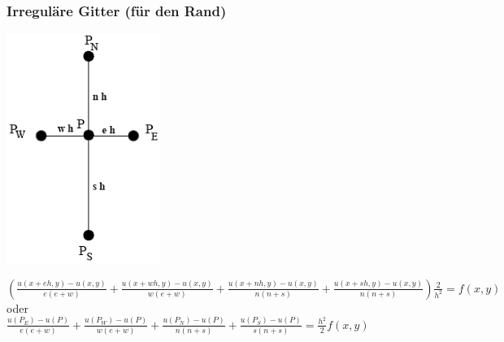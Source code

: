 \subsubsection{Irreguläre Gitter (für den Rand)}
\begin{minipage}{5cm}
	\includegraphics[width=5cm]{Content/Numerik/irregulaereGitter.png}

\end{minipage}
\hfill
\begin{minipage}{14cm}

$\left(\frac{u(x+eh,y)-u(x,y)}{e(e+w)} +\frac{u(x+wh,y)-u(x,y)}{w(e+w)}+\frac{u(x+nh,y)-u(x,y)}{n(n+s)} + \frac{u(x+sh,y)-u(x,y)}{n(n+s)}\right)\frac{2}{h^2}=f(x,y)$\\

oder
\\

$\frac{u(P_E) - u(P)}{e(e+w)} + \frac{u(P_W) - u(P)}{w(e+w)} + \frac{u(P_N) - u(P)}{n(n+s)} + \frac{u(P_S) - u(P)}{s(n+s)} = \frac{h^2}{2} f(x,y)$
\end{minipage}

